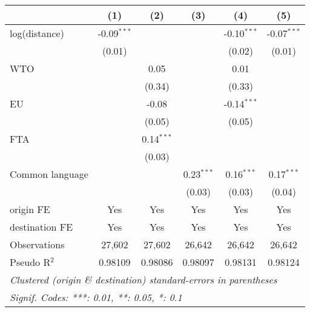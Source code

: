 
\begingroup
\centering
\small
\begin{tabular}{lccccc}
   \toprule
                   & (1)           & (2)          & (3)          & (4)           & (5)\\  
   \midrule 
   log(distance)   & -0.09$^{***}$ &              &              & -0.10$^{***}$ & -0.07$^{***}$\\   
                   & (0.01)        &              &              & (0.02)        & (0.01)\\   
   WTO             &               & 0.05         &              & 0.01          &   \\   
                   &               & (0.34)       &              & (0.33)        &   \\   
   EU              &               & -0.08        &              & -0.14$^{***}$ &   \\   
                   &               & (0.05)       &              & (0.05)        &   \\   
   FTA             &               & 0.14$^{***}$ &              &               &   \\   
                   &               & (0.03)       &              &               &   \\   
   Common language &               &              & 0.23$^{***}$ & 0.16$^{***}$  & 0.17$^{***}$\\   
                   &               &              & (0.03)       & (0.03)        & (0.04)\\   
   \midrule 
   origin FE       & Yes           & Yes          & Yes          & Yes           & Yes\\  
   destination FE  & Yes           & Yes          & Yes          & Yes           & Yes\\  
   \midrule 
   Observations    & 27,602        & 27,602       & 26,642       & 26,642        & 26,642\\  
   Pseudo R$^2$    & 0.98109       & 0.98086      & 0.98097      & 0.98131       & 0.98124\\  
   \bottomrule
   \multicolumn{6}{l}{\emph{Clustered (origin \& destination) standard-errors in parentheses}}\\
   \multicolumn{6}{l}{\emph{Signif. Codes: ***: 0.01, **: 0.05, *: 0.1}}\\
\end{tabular}
\par\endgroup


